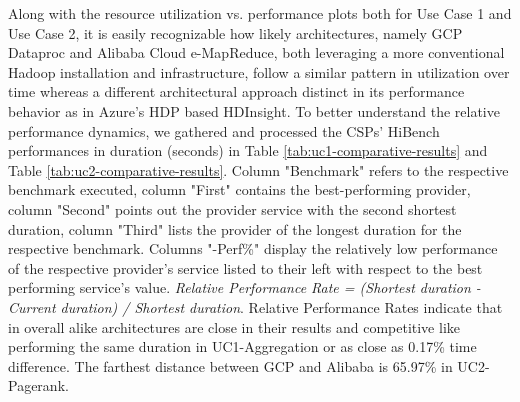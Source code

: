 \documentclass[review]{elsarticle}
\begin{document}
Along with the resource utilization vs. performance plots both for Use Case 1 and Use Case 2, it is easily recognizable how likely architectures, namely GCP Dataproc and Alibaba Cloud e-MapReduce, both leveraging a more conventional Hadoop installation and infrastructure, follow a similar pattern in utilization over time whereas a different architectural approach distinct in its performance behavior as in Azure's HDP based HDInsight. To better understand the relative performance dynamics, we gathered and processed the CSPs' HiBench performances in duration (seconds) in Table \ref{tab:uc1-comparative-results} and Table \ref{tab:uc2-comparative-results}. Column "Benchmark" refers to the respective benchmark executed, column "First" contains the best-performing provider, column "Second" points out the provider service with the second shortest duration, column "Third" lists the provider of the longest duration for the respective benchmark. Columns "-Perf\%" display the relatively low performance of the respective provider's service listed to their left with respect to the best performing service's value. \textit{Relative Performance Rate = (Shortest duration - Current duration) / Shortest duration}. Relative Performance Rates indicate that in overall alike architectures are close in their results and competitive like performing the same duration in UC1-Aggregation or as close as 0.17\% time difference. The farthest distance between GCP and Alibaba is 65.97\% in UC2-Pagerank.
\end{document}
